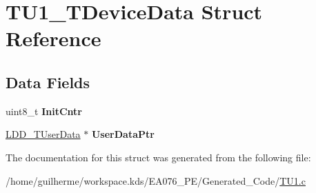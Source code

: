 \hypertarget{struct_t_u1___t_device_data}{}\section{T\+U1\+\_\+\+T\+Device\+Data Struct Reference}
\label{struct_t_u1___t_device_data}
\subsection*{Data Fields}
\begin{DoxyCompactItemize}
\item 
\mbox{\label{struct_t_u1___t_device_data_a6f7812497a6a66d8ce0baace72a4a0c6}} 
uint8\+\_\+t {\bfseries Init\+Cntr}
\item 
\mbox{\label{struct_t_u1___t_device_data_a3998052c6674b750711c4ce24df0a417}} 
\hyperlink{group___p_e___types__module_ga0b66a73f87238a782318aa0be7578e35}{L\+D\+D\+\_\+\+T\+User\+Data} $\ast$ {\bfseries User\+Data\+Ptr}
\end{DoxyCompactItemize}


The documentation for this struct was generated from the following file\+:\begin{DoxyCompactItemize}
\item 
/home/guilherme/workspace.\+kds/\+E\+A076\+\_\+\+P\+E/\+Generated\+\_\+\+Code/\hyperlink{_t_u1_8c}{T\+U1.\+c}\end{DoxyCompactItemize}
